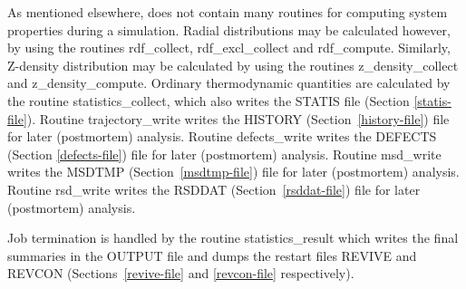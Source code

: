 As mentioned elsewhere, \D does not contain many routines for
computing system properties during a simulation.  Radial
distributions may be calculated however, by using the routines
{\sc rdf\_collect}, {\sc rdf\_excl\_collect} and {\sc rdf\_compute}.
Similarly, Z-density distribution may be calculated by using the
routines {\sc z\_density\_collect} and {\sc z\_density\_compute}.
Ordinary thermodynamic quantities are calculated by the routine
{\sc statistics\_collect}, which also writes the STATIS file (Section
\ref{statis-file}).  Routine {\sc trajectory\_write} writes the
HISTORY (Section~\ref{history-file}) file for later (postmortem)
analysis.  Routine {\sc defects\_write} writes the DEFECTS (Section
\ref{defects-file}) file for later (postmortem) analysis.  Routine
{\sc msd\_write} writes the MSDTMP (Section~\ref{msdtmp-file})
file for later (postmortem) analysis.  Routine {\sc rsd\_write}
writes the RSDDAT (Section~\ref{rsddat-file}) file for later
(postmortem) analysis.

Job termination is handled by the routine {\sc statistics\_result}
which writes the final summaries in the OUTPUT file and dumps the
restart files REVIVE and REVCON (Sections~\ref{revive-file} and
\ref{revcon-file} respectively).
